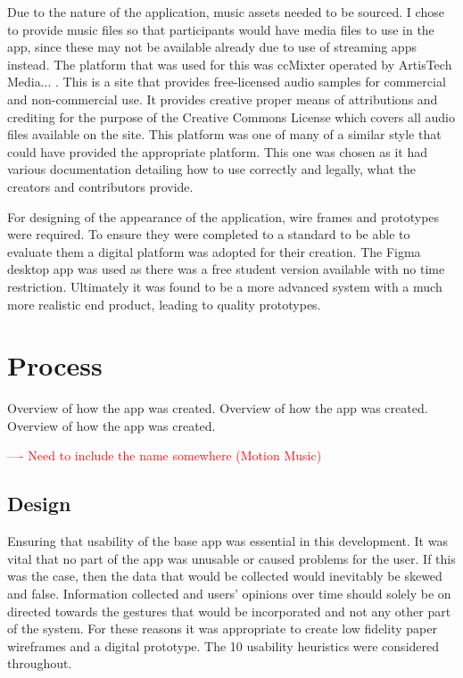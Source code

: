 \documentclass{l4proj}
\begin{document}
Due to the nature of the application, music assets needed to be sourced. I chose to provide music files so that participants would have media files to use in the app, since these may not be available already due to use of streaming apps instead. The platform that was used for this was ccMixter operated by ArtisTech Media... . This is a site that provides free-licensed audio samples for commercial and non-commercial use. It provides creative proper means of attributions and crediting for the purpose of the Creative Commons License which covers all audio files available on the site. This platform was one of many of a similar style that could have provided the appropriate platform. This one was chosen as it had various documentation detailing how to use correctly and legally, what the creators and contributors provide.

For designing of the appearance of the application, wire frames and prototypes were required. To ensure they were completed to a standard to be able to evaluate them a digital platform was adopted for their creation. The Figma desktop app was used as there was a free student version available with no time restriction. Ultimately it was found to be a more advanced system with a much more realistic end product, leading to quality prototypes.


\section{Process}

Overview of how the app was created. Overview of how the app was created. Overview of how the app was created.

\textcolor{red}{---- Need to include the name somewhere (Motion Music)}


\subsection{Design}

Ensuring that usability of the base app was essential in this development. It was vital that no part of the app was unusable or caused problems for the user. If this was the case, then the data that would be collected would inevitably be skewed and false. Information collected and users’ opinions over time should solely be on directed towards the gestures that would be incorporated and not any other part of the system. For these reasons it was appropriate to create low fidelity paper wireframes and a digital prototype. The 10 usability heuristics were considered throughout.
\end{document}
